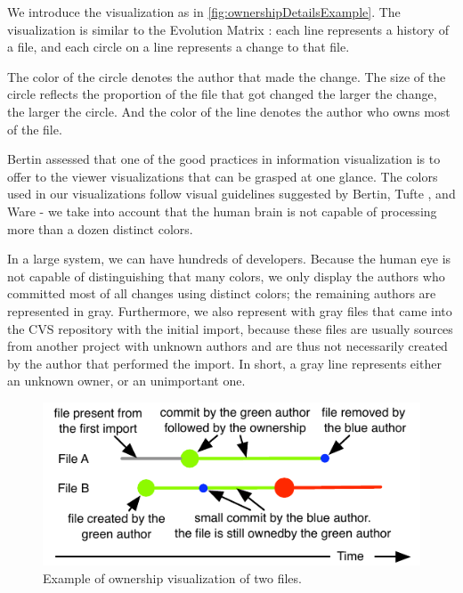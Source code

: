 We introduce the \omap visualization as in \autoref{fig:ownershipDetailsExample}. The visualization is similar to the Evolution Matrix \cite{Lanz02a}: each line represents a history of a file, and each circle on a line represents a change to that file.

The color of the circle denotes the author that made the change. The size of the circle reflects the proportion of the file that got changed \ie the larger the change, the larger the circle. And the color of the line denotes the author who owns most of the file.

Bertin \cite{Bert74a} assessed that one of the good practices in information visualization is to offer to the viewer visualizations that can be grasped at one glance. The colors used in our visualizations follow visual guidelines suggested by Bertin, Tufte \cite{Tuft90a}, and Ware \cite{Ware00a} \-- \eg we take into account that the human brain is not capable of processing more than a dozen distinct colors.

In a large system, we can have hundreds of developers. Because the human eye is not capable of distinguishing that many colors, we only display the authors who committed most of all changes using distinct colors; the remaining authors are represented in gray. Furthermore, we also represent with gray files that came into the CVS repository with the initial import, because these files are usually sources from another project with unknown authors and are thus not necessarily created by the author that performed the import. In short, a gray line represents either an unknown owner, or an unimportant one.

\begin{figure}[htb]
\begin{center}
\includegraphics[width=\linewidth]{fig/hapax-owners-map-detail.pdf}
\caption{Example of ownership visualization of two files.}
\label{fig:ownershipDetailsExample}
\end{center}
\end{figure}

